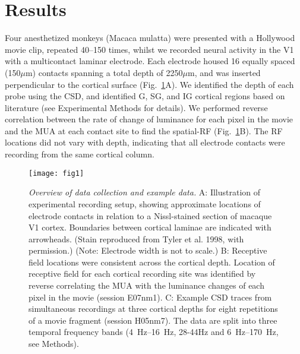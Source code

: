 \section{Results}
Four anesthetized monkeys (Macaca mulatta) were presented with a Hollywood movie clip, repeated 40--150 times, whilst we recorded neural activity in the \ac{V1} with a multicontact laminar electrode.
Each electrode housed 16 equally spaced (150\hspace{0.2em}$\mu$m) contacts spanning a total depth of 2250\hspace{0.2em}$\mu$m, and was inserted perpendicular to the cortical surface (Fig.~\ref{fig:lam_1}A).
We identified the depth of each probe using the \ac{CSD}, and identified \ac{G}, \ac{SG}, and \ac{IG} cortical regions based on literature (see Experimental Methods for details).
We performed reverse correlation between the rate of change of luminance for each pixel in the movie and the \ac{MUA} at each contact site to find the spatial-\ac{RF} (Fig.~\ref{fig:lam_1}B).
The \ac{RF} locations did not vary with depth, indicating that all electrode contacts were recording from the same cortical column.

\begin{figure}[htbp]
\centering \texttt{[image: fig1]}
%
\caption{%
\textit{Overview of data collection and example data.}
A: Illustration of experimental recording setup, showing approximate locations 
of electrode contacts in relation to a Nissl-stained section of macaque \ac{V1} 
cortex.
Boundaries between cortical laminae are indicated with arrowheads.
(Stain reproduced from Tyler et al. 1998, with permission.) (Note: Electrode 
width is not to scale.)
B: Receptive field locations were consistent across the 
cortical depth.
Location of receptive field for each cortical recording site 
was identified by reverse 
correlating the \ac{MUA} with the luminance changes of each 
pixel in the movie (session E07nm1).
C: Example \ac{CSD} traces from simultaneous recordings at three cortical depths for eight 
repetitions of a movie fragment (session H05nm7).
The data are split into three temporal frequency bands (\SIrange{4}{16}{Hz}, 28-44Hz and \SIrange{6}{170}{Hz}, see Methods).
}%
\label{fig:lam_1}
%
\end{figure}

